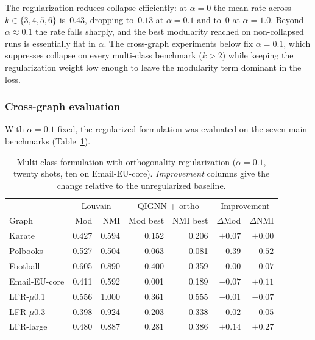 The regularization reduces collapse efficiently: at $\alpha=0$
the mean rate across $k\in\{3,4,5,6\}$ is~$\!0.43$, dropping
to~$\!0.13$ at $\alpha=0.1$ and to~$0$ at $\alpha=1.0$. Beyond
$\alpha\approx 0.1$ the rate falls sharply, and the best
modularity reached on non-collapsed runs is essentially flat in
$\alpha$. The cross-graph experiments below fix $\alpha = 0.1$,
which suppresses collapse on every multi-class benchmark
($k > 2$) while keeping the regularization weight low enough to
leave the modularity term dominant in the loss.

\subsubsection{Cross-graph evaluation}
\label{sec:exp_ortho_crossgraph}

With $\alpha = 0.1$ fixed, the regularized formulation was
evaluated on the seven main benchmarks
(Table~\ref{tab:ortho_crossgraph}).

\begin{table}[H]
    \caption{Multi-class formulation with orthogonality
    regularization ($\alpha = 0.1$, twenty shots, ten on
    Email-EU-core). \emph{Improvement} columns give the change
    relative to the unregularized baseline.}
    \label{tab:ortho_crossgraph}
    \centering
    \small
    \begin{tabular}{lrrrr|rr}
        \toprule
         & \multicolumn{2}{c}{Louvain} & \multicolumn{2}{c|}{QIGNN + ortho} & \multicolumn{2}{c}{Improvement} \\
        Graph & Mod & NMI & Mod best & NMI best & $\Delta$Mod & $\Delta$NMI \\
        \midrule
        Karate          & 0.427 & 0.594 & 0.152 & 0.206 & $+0.07$ & $+0.00$ \\
        Polbooks        & 0.527 & 0.504 & 0.063 & 0.081 & $-0.39$ & $-0.52$ \\
        Football        & 0.605 & 0.890 & 0.400 & 0.359 & $0.00$ & $-0.07$ \\
        Email-EU-core   & 0.411 & 0.592 & 0.001 & 0.189 & $-0.07$ & $+0.11$ \\
        LFR-$\mu$0.1    & 0.556 & 1.000 & 0.361 & 0.555 & $-0.01$ & $-0.07$ \\
        LFR-$\mu$0.3    & 0.398 & 0.924 & 0.203 & 0.338 & $-0.02$ & $-0.05$ \\
        LFR-large       & 0.480 & 0.887 & 0.281 & 0.386 & $+0.14$ & $+0.27$ \\
        \bottomrule
    \end{tabular}
\end{table}

